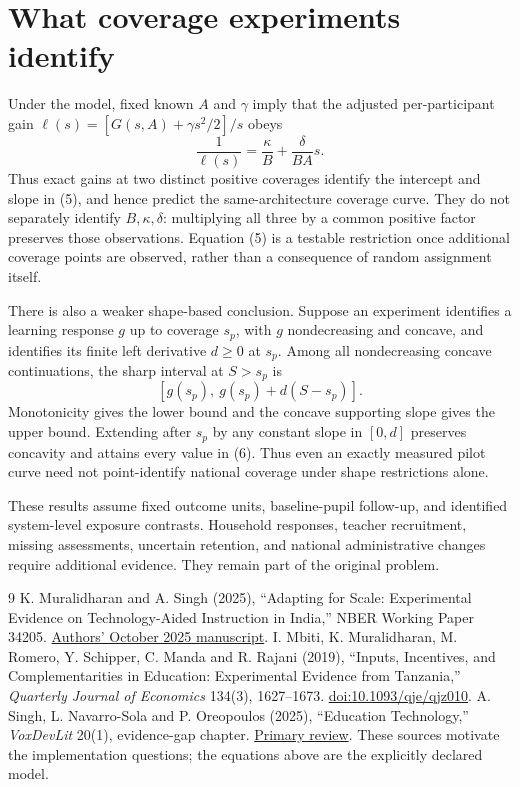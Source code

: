 \documentclass[11pt,a4paper]{article}
\theoremstyle{remark}
\begin{document}
\section{What coverage experiments identify}
Under the model, fixed known $A$ and $\gamma$ imply that the adjusted per-participant gain
$\ell(s)=[G(s,A)+\gamma s^2/2]/s$ obeys
\[
 \frac1{\ell(s)}=\frac\kappa B+\frac\delta{BA}s. \tag{5}
\]
Thus exact gains at two distinct positive coverages identify the intercept and slope in (5), and hence predict the same-architecture coverage curve. They do not separately identify $B,\kappa,\delta$: multiplying all three by a common positive factor preserves those observations. Equation (5) is a testable restriction once additional coverage points are observed, rather than a consequence of random assignment itself.

There is also a weaker shape-based conclusion. Suppose an experiment identifies a learning response $g$ up to coverage $s_p$, with $g$ nondecreasing and concave, and identifies its finite left derivative $d\ge0$ at $s_p$. Among all nondecreasing concave continuations, the sharp interval at $S>s_p$ is
\[
 [g(s_p),\ g(s_p)+d(S-s_p)]. \tag{6}
\]
Monotonicity gives the lower bound and the concave supporting slope gives the upper bound. Extending after $s_p$ by any constant slope in $[0,d]$ preserves concavity and attains every value in (6). Thus even an exactly measured pilot curve need not point-identify national coverage under shape restrictions alone.

These results assume fixed outcome units, baseline-pupil follow-up, and identified system-level exposure contrasts. Household responses, teacher recruitment, missing assessments, uncertain retention, and national administrative changes require additional evidence. They remain part of the original problem.

\begin{thebibliography}{9}
 K. Muralidharan and A. Singh (2025), ``Adapting for Scale: Experimental Evidence on Technology-Aided Instruction in India,'' NBER Working Paper 34205. \href{https://cdep.sipa.columbia.edu/sites/cdep.sipa.columbia.edu/files/content/Mindspark_Rajasthan\%20\%287\%20October\%202025\%29.pdf}{Authors' October 2025 manuscript}.
 I. Mbiti, K. Muralidharan, M. Romero, Y. Schipper, C. Manda and R. Rajani (2019), ``Inputs, Incentives, and Complementarities in Education: Experimental Evidence from Tanzania,'' \emph{Quarterly Journal of Economics} 134(3), 1627--1673. \href{https://doi.org/10.1093/qje/qjz010}{doi:10.1093/qje/qjz010}.
 A. Singh, L. Navarro-Sola and P. Oreopoulos (2025), ``Education Technology,'' \emph{VoxDevLit} 20(1), evidence-gap chapter. \href{https://voxdev.org/voxdevlit/education-technology/edtech-evidence-gaps}{Primary review}. These sources motivate the implementation questions; the equations above are the explicitly declared model.
\end{thebibliography}
\end{document}
